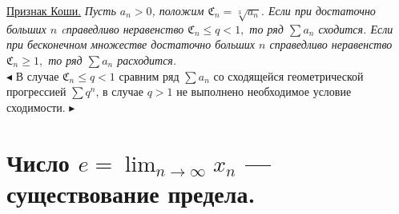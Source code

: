 \underline{Признак Коши.}
\textit{Пусть $a_n > 0$, положим $\mathfrak{C}_n = \sqrt[3]{a_n}.$ Если при достаточно больших $n$ cправедливо неравенство $\mathfrak{C}_n \leq q < 1,$ то ряд $\sum a_n$ сходится. Если при бесконечном множестве достаточно больших $n$ справедливо неравенство $\mathfrak{C}_n \geq 1,$ то ряд $\sum a_n$ расходится.}  \\
$\blacktriangleleft$
В случае $\mathfrak{C}_n \leq q < 1$ сравним ряд $\sum a_n$ со сходящейся геометрической прогрессией $\sum q^n$, в случае $q > 1$ не выполнено необходимое условие сходимости. $\blacktriangleright$
\\

\section{Число $e = \lim_{n \to\infty}{x_n}$ — существование предела.}

